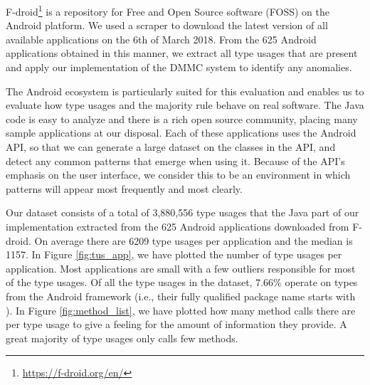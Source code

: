 F-droid\footnote{\url{https://f-droid.org/en/}} is a repository for Free and Open Source software (FOSS) on the Android platform.
We used a scraper to download the latest version of all available applications on the 6th of March 2018.
From the 625 Android applications obtained in this manner, we extract all type usages that are present and apply our implementation of the $\text{DMMC}$ system to identify any anomalies.

The Android ecosystem is particularly suited for this evaluation and enables us to evaluate how type usages and the majority rule behave on real software.
The Java code is easy to analyze and there is a rich open source community, placing many sample applications at our disposal.
Each of these applications uses the Android API, so that we can generate a large dataset on the classes in the API, and detect any common patterns that emerge when using it.
Because of the API's emphasis on the user interface, we consider this to be an environment in which patterns will appear most frequently and most clearly.

Our dataset consists of a total of 3,880,556 type usages that the Java part of our implementation extracted from the 625 Android applications downloaded from F-droid.
On average there are 6209 type usages per application and the median is 1157.
In Figure \ref{fig:tus_app}, we have plotted the number of type usages per application.
Most applications are small with a few outliers responsible for most of the type usages.
Of all the type usages in the dataset, $7.66\%$ operate on types from the Android framework (i.e., their fully qualified package name starts with ).
In Figure \ref{fig:method_list}, we have plotted how many method calls there are per type usage to give a feeling for the amount of information they provide.
A great majority of type usages only calls few methods.

